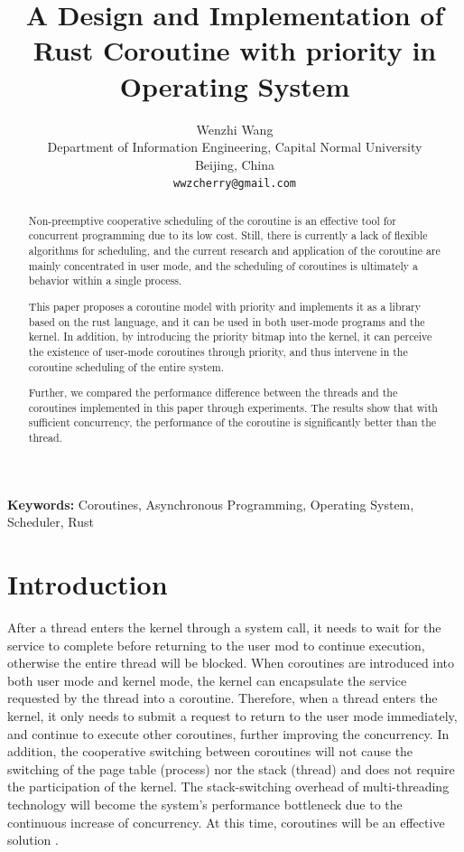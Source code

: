 \documentclass[10pt]{article}
\title{A Design and Implementation of Rust Coroutine with priority in Operating System}
\author{
  Wenzhi Wang \\
  Department of Information Engineering, Capital Normal University \\
  Beijing, China \\
  {\tt wwzcherry@gmail.com}}
\date{}
\begin{document}
\maketitle
\begin{abstract}
Non-preemptive cooperative scheduling of the coroutine is an effective tool for concurrent programming due to its low cost. Still, there is currently a lack of flexible algorithms for scheduling, and the current research and application of the coroutine are mainly concentrated in user mode, and the scheduling of coroutines is ultimately a behavior within a single process. 

This paper proposes a coroutine model with priority and implements it as a library based on the rust language, and it can be used in both user-mode programs and the kernel. In addition, by introducing the priority bitmap into the kernel, it can perceive the existence of user-mode coroutines through priority, and thus intervene in the coroutine scheduling of the entire system.

Further, we compared the performance difference between the threads and the coroutines implemented in this paper through experiments. The results show that with sufficient concurrency, the performance of the coroutine is significantly better than the thread.
\end{abstract}

{\bf Keywords:} Coroutines, Asynchronous Programming, Operating System, Scheduler, Rust

\section{Introduction}

After a thread enters the kernel through a system call, it needs to wait for the service to complete before returning to the user mod to continue execution, otherwise the entire thread will be blocked. When coroutines are introduced into both user mode and kernel mode, the kernel can encapsulate the service requested by the thread into a coroutine. Therefore, when a thread enters the kernel, it only needs to submit a request to return to the user mode immediately, and continue to execute other coroutines, further improving the concurrency. In addition, the cooperative switching between coroutines will not cause the switching of the page table (process) nor the stack (thread) and does not require the participation of the kernel. The stack-switching overhead of multi-threading technology will become the system's performance bottleneck due to the continuous increase of concurrency. At this time, coroutines will be an effective solution  \cite{belson2019survey} .
\end{document}
